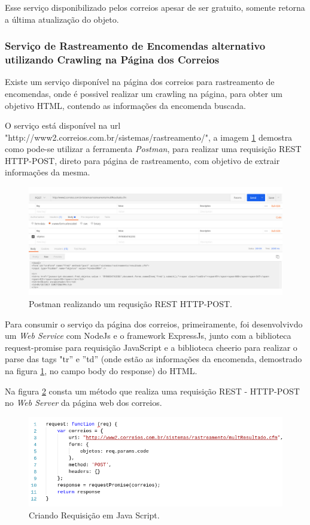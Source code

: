\documentclass[journal]{IEEEtran}
\begin{document}
Esse serviço disponibilizado pelos correios apesar de ser gratuito, somente retorna a última atualização do objeto.
\subsubsection{Serviço de Rastreamento de Encomendas alternativo utilizando Crawling na Página dos Correios}\label{web:alt}

Existe um serviço disponível na página dos correios para rastreamento de encomendas, onde é possivel realizar um crawling na página, para obter um objetivo HTML, contendo as informações da encomenda buscada.

O serviço está disponível na url "http://www2.correios.com.br/sistemas/rastreamento/", a imagem \ref{c1} demostra como pode-se utilizar a ferramenta \textit{Postman}, para realizar uma requisição REST HTTP-POST, direto para página de rastreamento, com objetivo de extrair informações da mesma.

\begin{figure}[H]
	\centering
	\includegraphics[scale=0.3]{Imagens/c1.jpg}
	\caption{Postman realizando um requsição REST HTTP-POST.}
	\label{c1}
\end{figure}


Para consumir o serviço da página dos correios, primeiramente, foi desenvolvivdo um \textit{Web Service} com NodeJs e o framework ExpressJs, junto com a biblioteca request-promise para requisição JavaScript e a biblioteca cheerio para realizar o parse das tags "tr'' e ''td'' (onde estão as informações da encomenda, demostrado na figura  \ref{c1}, no campo body do response) do HTML.

Na figura \ref{c3} consta um método que realiza uma requisição REST - HTTP-POST no \textit{Web Server} da página web dos correios.
\begin{figure}[H]
	\centering
	\includegraphics[scale=0.55]{Imagens/req.png}
	\caption{Criando Requisição em Java Script.}
	\label{c3}
\end{figure}
\end{document}
